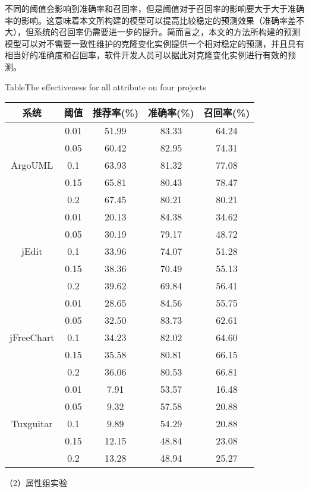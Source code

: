 不同的阈值会影响到准确率和召回率，但是阈值对于召回率的影响要大于大于准确率的影响。这意味着本文所构建的模型可以提高比较稳定的预测效果（准确率差不大），但系统的召回率仍需要进一步的提升。简而言之，本文的方法所构建的预测模型可以对不需要一致性维护的克隆变化实例提供一个相对稳定的预测，并且具有相当好的准确度和召回率，软件开发人员可以据此对克隆变化实例进行有效的预测。


\begin{table}[htbp]
{Table$\!$}{The effectiveness for all attribute on four projects}
\vspace{0.5em}
\centering
\wuhao
\begin{tabular}{ccccc}
\toprule[1.5pt]
{系统}&{阈值}&{推荐率(\%)}&{准确率(\%)}&{召回率(\%)}\\
\midrule[1pt]
\multirow{5}{*}{ArgoUML}
&0.01&	51.99&	83.33&	64.24\\
&0.05&	60.42&	82.95&	74.31\\
&0.1&	63.93&	81.32&	77.08\\
&0.15&	65.81&	80.43&	78.47\\
&0.2&	67.45&	80.21&	80.21\\
\hline
\multirow{5}{*}{jEdit}
&0.01&	20.13&	84.38&	34.62\\
&0.05&	30.19&	79.17&	48.72\\
&0.1&	33.96&	74.07&	51.28\\
&0.15&	38.36&	70.49&	55.13\\
&0.2&	39.62&	69.84&	56.41\\
\hline
\multirow{5}{*}{jFreeChart}
&0.01&	28.65&	84.56&	55.75\\
&0.05&	32.50&	83.73&	62.61\\
&0.1&	34.23&	82.02&	64.60\\
&0.15&	35.58&	80.81&	66.15\\
&0.2&	36.06&	80.53&	66.81\\
\hline
\multirow{5}{*}{Tuxguitar}
&0.01&	7.91&	53.57&	16.48\\
&0.05&	9.32&	57.58&	20.88\\
&0.1&	9.89&	54.29&	20.88\\
&0.15&	12.15&	48.84&	23.08\\
&0.2&	13.28&	48.94&	25.27\\
\bottomrule[1.5pt]
\end{tabular}
\end{table}



（2）属性组实验

